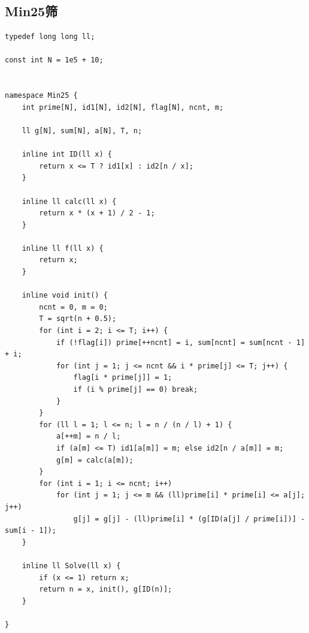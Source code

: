 \documentclass[twoside]{article}
\begin{document}
\subsection{Min25筛}
\begin{lstlisting}
typedef long long ll;

const int N = 1e5 + 10;


namespace Min25 {
    int prime[N], id1[N], id2[N], flag[N], ncnt, m;

    ll g[N], sum[N], a[N], T, n;

    inline int ID(ll x) {
        return x <= T ? id1[x] : id2[n / x];
    }

    inline ll calc(ll x) {
        return x * (x + 1) / 2 - 1;
    }

    inline ll f(ll x) {
        return x;
    }

    inline void init() {
        ncnt = 0, m = 0;
        T = sqrt(n + 0.5);
        for (int i = 2; i <= T; i++) {
            if (!flag[i]) prime[++ncnt] = i, sum[ncnt] = sum[ncnt - 1] + i;
            for (int j = 1; j <= ncnt && i * prime[j] <= T; j++) {
                flag[i * prime[j]] = 1;
                if (i % prime[j] == 0) break;
            }
        }
        for (ll l = 1; l <= n; l = n / (n / l) + 1) {
            a[++m] = n / l;
            if (a[m] <= T) id1[a[m]] = m; else id2[n / a[m]] = m;
            g[m] = calc(a[m]);
        }
        for (int i = 1; i <= ncnt; i++)
            for (int j = 1; j <= m && (ll)prime[i] * prime[i] <= a[j]; j++)
                g[j] = g[j] - (ll)prime[i] * (g[ID(a[j] / prime[i])] - sum[i - 1]);
    }

    inline ll Solve(ll x) {
        if (x <= 1) return x;
        return n = x, init(), g[ID(n)];
    }

}
\end{lstlisting}
\end{document}
